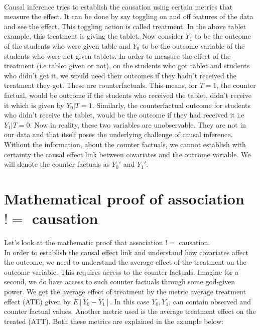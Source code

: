 \documentclass{article}
\begin{document}
\paragraph{}{Causal inference tries to establish the causation using certain metrics that measure the effect. It can be done by say toggling
on and off features of the data and see the effect. This toggling action is called treatment. In the above tablet example, this treatment is
giving the tablet. Now consider $Y_1$ to be the outcome of the students who were given table and $Y_0$ to be the outcome variable of the students who were
not given tablets. In order to measure the effect of the treatment (i.e tablet given or not),  on the students who got tablet and students who didn't get it,
we would need their outcomes if they hadn't received the treatment they got. These are counterfactuals. This means, for $T = 1$, the counter factual,
would be outcome if the students who received the tablet, didn't receive it which is given by $Y_0 | T = 1$. Similarly, the counterfactual
outcome for students who didn't receive the tablet, would be the outcome if they had received it i.e $Y_1 | T = 0$. Now in reality, these
two variables are unobservable. They are not in our data and that itself poses the underlying challenge of causal inference. Without the information,
about the counter factuals, we cannot establish with certainty the causal effect link between covariates and the outcome variable. We will 
denote the counter factuals as $Y_0'$ and $Y_1'$.}

\section{Mathematical proof of association $!=$ causation}
Let's look at the mathematic proof that association $!=$ causation.\\

In order to establish the causal effect link and understand how covariates affect the outcome, we need to understand the average effect
of the treatment on the outcome variable. This requires access to the counter factuals. Imagine for a second, we do have access to such counter factuals
through some god-given power. We get the average effect of treatment by the metric average treatment effect (ATE) given by $E[Y_0 - Y_1]$. In this case $Y_0, Y_1$, can contain
observed and counter factual values. Another metric used is the average treatment effect on the treated (ATT). Both these metrics are explained
in the example below:\\
\end{document}
